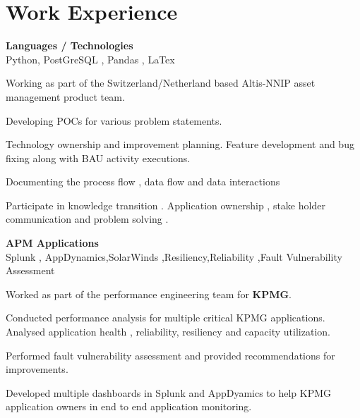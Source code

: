 \documentclass[a4,10pt]{cv4tw}
\begin{document}
\section{Work Experience}
{\textbf{Languages / Technologies} \\Python, PostGreSQL , Pandas , LaTex }
	{
	\begin{missions}
  \item Working as part of the Switzerland/Netherland based Altis-NNIP asset management product team. 
  \item Developing POCs for various problem statements.
  \item Technology ownership and improvement planning. Feature development and bug fixing along with  BAU activity executions.
  \item Documenting the process flow , data flow and data interactions 
  \item Participate in knowledge transition . Application ownership , stake holder communication and problem solving . 
	\end{missions}
}
{\textbf{APM Applications}  \\Splunk , AppDynamics,SolarWinds ,Resiliency,Reliability ,Fault Vulnerability Assessment}
	{
	\begin{missions}
  \item Worked as part of the performance engineering team for \textbf{KPMG}.
  \item Conducted performance analysis for multiple critical KPMG applications. Analysed  application health , reliability, resiliency and capacity utilization.
  \item Performed fault vulnerability assessment and provided recommendations for improvements.
  \item Developed multiple dashboards in Splunk and AppDyamics to help KPMG application owners in end to end application monitoring.
	\end{missions}
}
\end{document}
